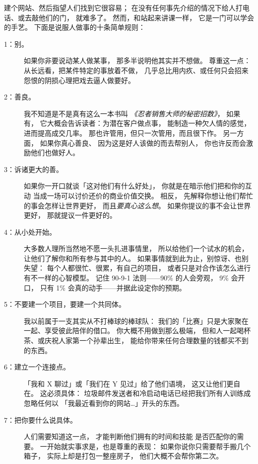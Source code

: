 建个网站、然后指望人们找到它很容易；
在没有任何事先介绍的情况下给人打电话、或去敲他们的门，
就难多了。
然而，和站起来讲课一样，
它是一门可以学会的手艺。
下面是说服人做事的十条简单规则：

\begin{description}

\item[1：别。]
  如果你非要说动某人做某事，
  那多半说明他其实并不想做。
  尊重这一点：
  从长远看，把某件特定的事放着不做，
  几乎总比用内疚、或任何只会招来怨恨的阴损心理把戏去逼人做要好。

\item[2：善良。]
  我不知道是不是真有这么一本书叫
  \emph{《忍者销售大师的秘密招数》}，
  如果有，
  它大概会告诉读者：为潜在客户做点事，
  能制造一种欠人情的感觉，
  进而提高成交几率。
  那也许管用，但只一次管用，而且很下作。
  另一方面，
  如果你真心善良、
  因为这是好人该做的而去帮别人，
  你也许反而会激励他们也做好人。

\item[3：诉诸更大的善。]
  如果你一开口就谈「这对他们有什么好处」，
  你就是在暗示他们把和你的互动
  当成一场可以讨价还价的商业价值交换。
  相反，
  先解释你想让他们帮忙的事会怎样让世界更好，
  而且\emph{要真心这么想}。
  如果你提议的事不会让世界更好，
  那就提议一件更好的。

\item[4：从小处开始。]
  大多数人理所当然地不愿一头扎进事情里，
  所以给他们一个试水的机会，
  让他们了解你和所有参与其中的人。
  如果事情就到此为止，别惊讶、也别失望：
  每个人都很忙、很累，有自己的项目，
  或者只是对合作该怎么进行有不一样的心智模型。
  记住 90-9-1 法则——90\% 的人会旁观，
  9\% 会开口，
  只有 1\% 会真的动手——并据此设定你的预期。

\item[5：不要建一个项目，要建一个共同体。]
  我以前属于一支其实从不打棒球的棒球队：
  我们的「比赛」只是大家聚在一起、享受彼此陪伴的借口。
  你大概不用做到那么极端，
  但和人一起喝杯茶、或庆祝人家第一个孙辈出生，
  能给你带来任何合理数量的钱都买不到的东西。

\item[6：建立一个连接点。]
  「我和 X 聊过」或「我们在 Y 见过」给了他们语境，
  这又让他们更自在。
  这必须具体：
  垃圾邮件发送者和冷启动电话已经把我们所有人训练成忽略任何以
  「我最近看到你的网站{\ldots}」开头的东西。

\item[7：把你要什么说具体。]
  人们需要知道这一点，
  才能判断他们拥有的时间和技能
  是否匹配你的需要。
  一开始就实事求是，也是尊重的表现：
  如果你说你只需要帮手搬几个箱子，
  实际上却是打包一整座房子，
  他们大概不会帮你第二次。


\end{description}
